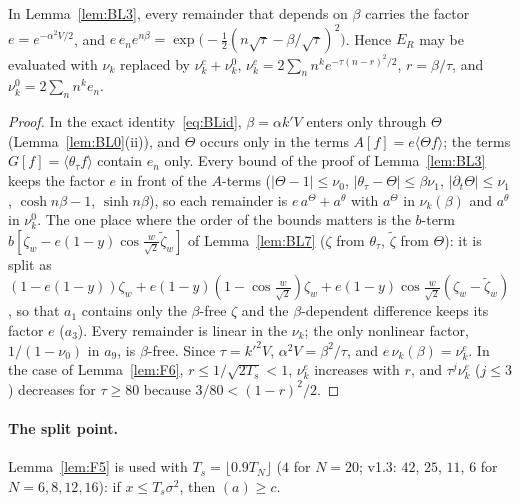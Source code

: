 \begin{lemma} \proofst
\label{lem:Fe}
In Lemma~\ref{lem:BL3}, every remainder that depends on $\beta$ carries the factor $e=e^{-\alpha^2V/2}$, and $e\,e_ne^{n\beta}=\exp\!\big(-\tfrac12(n\sqrt\tau-\beta/\sqrt\tau)^2\big)$.
Hence $E_R$ may be evaluated with $\nu_k$ replaced by $\nu_k^e+\nu_k^0$, $\nu_k^e=2\sum_nn^ke^{-\tau(n-r)^2/2}$, $r=\beta/\tau$, and $\nu_k^0=2\sum_nn^ke_n$.
\end{lemma}
\begin{proof}
In the exact identity~\eqref{eq:BLid}, $\beta=\alpha k'V$ enters only through $\Theta$ (Lemma~\ref{lem:BL0}(ii)), and $\Theta$ occurs only in the terms $A[f]=e\langle\Theta f\rangle$;
the terms $G[f]=\langle\theta_\tau f\rangle$ contain $e_n$ only. Every bound of the proof of Lemma~\ref{lem:BL3} keeps the factor $e$ in front of the $A$-terms
($|\Theta-1|\le\nu_0$, $|\theta_\tau-\Theta|\le\beta\nu_1$, $|\partial_t\Theta|\le\nu_1$, $\cosh n\beta-1$, $\sinh n\beta$), so each remainder is $e\,a^\Theta+a^\theta$ with $a^\Theta$ in
$\nu_k(\beta)$ and $a^\theta$ in $\nu_k^0$. The one place where the order of the bounds matters is the $b$-term $b[\zeta_w-e(1-y)\cos\frac w{\sqrt2}\tilde\zeta_w]$ of
Lemma~\ref{lem:BL7} ($\zeta$ from $\theta_\tau$, $\tilde\zeta$ from $\Theta$): it is split as $(1-e(1-y))\zeta_w+e(1-y)(1-\cos\frac w{\sqrt2})\zeta_w+e(1-y)\cos\frac w{\sqrt2}(\zeta_w-\tilde\zeta_w)$,
so that $a_1$ contains only the $\beta$-free $\zeta$ and the $\beta$-dependent difference keeps its factor $e$ ($a_3$). Every remainder is linear in the $\nu_k$; the only
nonlinear factor, $1/(1-\nu_0)$ in $a_9$, is $\beta$-free. Since $\tau=k'^2V$, $\alpha^2V=\beta^2/\tau$, and $e\,\nu_k(\beta)=\nu_k^e$. In the case of Lemma~\ref{lem:F6},
$r\le1/\sqrt{2T_s}<1$, $\nu_k^e$ increases with $r$, and $\tau^j\nu_k^e$ ($j\le3$) decreases for $\tau\ge80$ because $3/80<(1-r)^2/2$.
\end{proof}

\paragraph*{The split point.} Lemma~\ref{lem:F5} is used with $T_s=\lfloor0.9T_N\rfloor$ ($4$ for $N=20$; v1.3: $42$, $25$, $11$, $6$ for $N=6,8,12,16$): if $x\le T_s\sigma^2$, then $(a)\ge c$.

